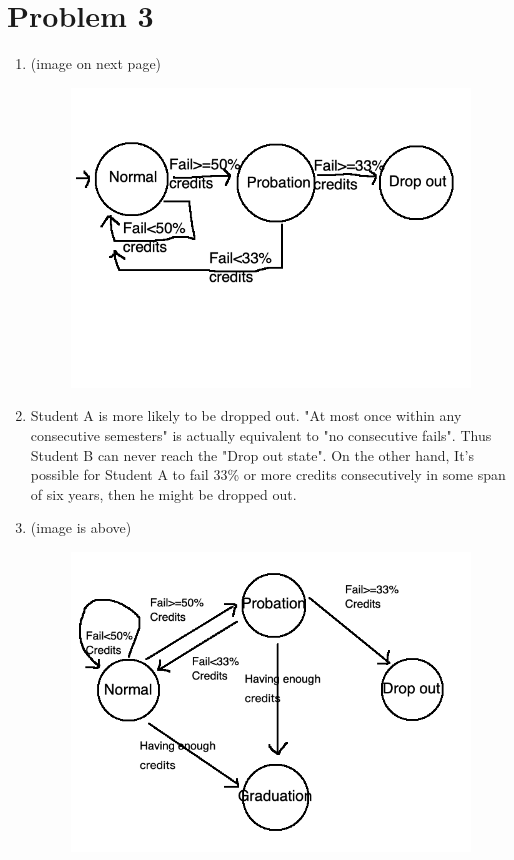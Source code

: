 \documentclass[12pt]{article}
\begin{document}
\section*{Problem 3}
\begin{enumerate}
    \item (image on next page)
    \begin{figure}
        \includegraphics[width=\linewidth]{finite-state1.png}
        \label{fig:finite_state1}
    \end{figure}
    \item Student A is more likely to be dropped out. "At most once within any consecutive semesters" is actually equivalent to
    "no consecutive fails". Thus Student B can never reach the "Drop out state". On the other hand,
    It's possible for Student A to fail 33\% or more credits consecutively in some span of six years, then he might be dropped out.
    \item (image is above)
    \begin{figure}
        \includegraphics[width=\linewidth]{finite-state2.png}
        \label{fig:finite_state2}
    \end{figure}
\end{enumerate}
\end{document}
